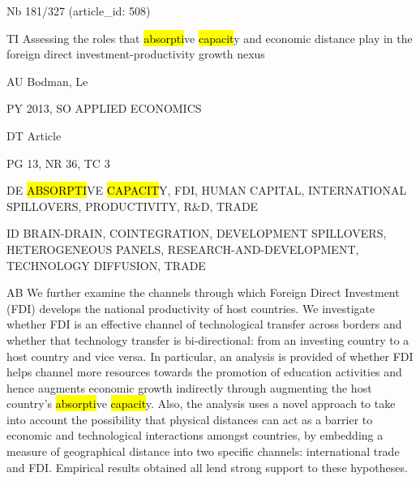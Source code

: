 \documentclass[a4paper]{article}
\begin{document}
\vspace*{-2cm}
Nb \tabto{0cm}181/327 (article\_id: 508)\par
TI \tabto{0cm}Assessing the roles that \hl{absorpti}ve \hl{capacit}y and economic distance play in the foreign direct investment-productivity growth nexus\par
AU \tabto{0cm}Bodman, Le\par
PY \tabto{0cm}2013, SO APPLIED ECONOMICS\par
DT \tabto{0cm}Article\par
PG \tabto{0cm}13, NR 36, TC 3\par
DE \tabto{0cm}\hl{ABSORPTI}VE \hl{CAPACIT}Y, FDI, HUMAN CAPITAL, INTERNATIONAL SPILLOVERS, PRODUCTIVITY, R\&D, TRADE\par
ID \tabto{0cm}BRAIN-DRAIN, COINTEGRATION, DEVELOPMENT SPILLOVERS, HETEROGENEOUS PANELS, RESEARCH-AND-DEVELOPMENT, TECHNOLOGY DIFFUSION, TRADE\par
AB \tabto{0cm}We further examine the channels through which Foreign Direct Investment (FDI) develops the national productivity of host countries. We investigate whether FDI is an effective channel of technological transfer across borders and whether that technology transfer is bi-directional: from an investing country to a host country and vice versa. In particular, an analysis is provided of whether FDI helps channel more resources towards the promotion of education activities and hence augments economic growth indirectly through augmenting the host country's \hl{absorpti}ve \hl{capacit}y. Also, the analysis uses a novel approach to take into account the possibility that physical distances can act as a barrier to economic and technological interactions amongst countries, by embedding a measure of geographical distance into two specific channels: international trade and FDI. Empirical results obtained all lend strong support to these hypotheses.\par
\clearpage
\end{document}
